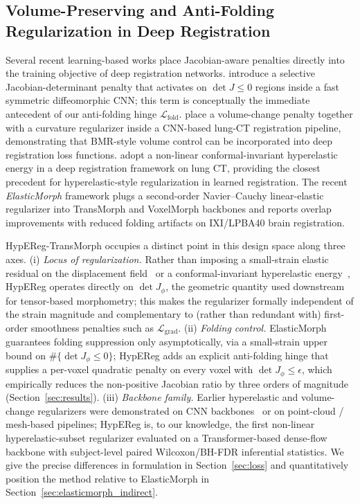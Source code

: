 \documentclass[jimaging,article,submit,pdftex,moreauthors]{Definitions/mdpi}
\begin{document}
\subsection{Volume-Preserving and Anti-Folding Regularization in Deep Registration}
Several recent learning-based works place Jacobian-aware penalties directly into the training objective of deep registration networks. \citet{mok2020fast} introduce a selective Jacobian-determinant penalty that activates on $\det J\le 0$ regions inside a fast symmetric diffeomorphic CNN; this term is conceptually the immediate antecedent of our anti-folding hinge $\mathcal{L}_{\mathrm{fold}}$. \citet{hering2021lung} place a volume-change penalty together with a curvature regularizer inside a CNN-based lung-CT registration pipeline, demonstrating that BMR-style volume control can be incorporated into deep registration loss functions. \citet{zou2023conformal} adopt a non-linear conformal-invariant hyperelastic energy in a deep registration framework on lung CT, providing the closest precedent for hyperelastic-style regularization in learned registration. The recent \emph{ElasticMorph} framework \cite{elasticmorph2025} plugs a second-order Navier--Cauchy linear-elastic regularizer into TransMorph and VoxelMorph backbones and reports overlap improvements with reduced folding artifacts on IXI/LPBA40 brain registration.

HypEReg-TransMorph occupies a distinct point in this design space along three axes. (i) \emph{Locus of regularization.} Rather than imposing a small-strain elastic residual on the displacement field~\cite{elasticmorph2025} or a conformal-invariant hyperelastic energy~\cite{zou2023conformal}, HypEReg operates directly on $\det J_\phi$, the geometric quantity used downstream for tensor-based morphometry; this makes the regularizer formally independent of the strain magnitude and complementary to (rather than redundant with) first-order smoothness penalties such as $\mathcal{L}_{\mathrm{grad}}$. (ii) \emph{Folding control.} ElasticMorph~\cite{elasticmorph2025} guarantees folding suppression only asymptotically, via a small-strain upper bound on $\#\{\det J_\phi\le 0\}$; HypEReg adds an explicit anti-folding hinge that supplies a per-voxel quadratic penalty on every voxel with $\det J_\phi\le\epsilon$, which empirically reduces the non-positive Jacobian ratio by three orders of magnitude (Section~\ref{sec:results}). (iii) \emph{Backbone family.} Earlier hyperelastic and volume-change regularizers were demonstrated on CNN backbones~\cite{mok2020fast,hering2021lung,zou2023conformal} or on point-cloud / mesh-based pipelines; HypEReg is, to our knowledge, the first non-linear hyperelastic-subset regularizer evaluated on a Transformer-based dense-flow backbone with subject-level paired Wilcoxon/BH-FDR inferential statistics. We give the precise differences in formulation in Section~\ref{sec:loss} and quantitatively position the method relative to ElasticMorph in Section~\ref{sec:elasticmorph_indirect}.
\end{document}
